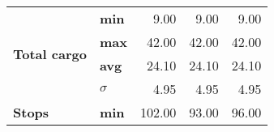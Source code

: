 \begin{table}[]
\begin{tabular}{llrrr}
\multirow{4}{*}{\textbf{Total cargo}}          & \textbf{min}        & 9.00                                                                                                                                              & 9.00                                                                                                                                              & 9.00                                                                                                                                            \\
                                               & \textbf{max}        & 42.00                                                                                                                                             & 42.00                                                                                                                                             & 42.00                                                                                                                                           \\
                                               & \textbf{avg}        & 24.10                                                                                                                                             & 24.10                                                                                                                                             & 24.10                                                                                                                                           \\
                                               & \textbf{$ \sigma $} & 4.95                                                                                                                                              & 4.95                                                                                                                                              & 4.95                                                                                                                                            \\ \hline
\multirow{4}{*}{\textbf{Stops}}                & \textbf{min}        & 102.00                                                                                                                                            & 93.00                                                                                                                                             & 96.00                                                                                                                                           \\

\end{tabular}
\end{table}
